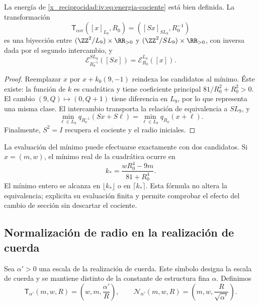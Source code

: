 \begin{theorem}
\label{x_reciprocidad:iv:thm:dualidad-cociente}
La energía de \eqref{x_reciprocidad:iv:eq:energia-cociente} está bien definida.
La transformación
\[
 \mathsf T_{\mathrm{cov}}([x]_{L_9},R_0)
 =([Sx]_{SL_9},R_0^{-1})
\]
es una biyección entre
\((\ZZ^2/L_9)\times\RR_{>0}\) y
\((\ZZ^2/SL_9)\times\RR_{>0}\), con inversa dada por el
segundo intercambio, y
\[
 \mathcal E_{R_0^{-1}}^{SL_9}([Sx])
 =\mathcal E_{R_0}^{L_9}([x]).
\]
\end{theorem}
\begin{proof}
Reemplazar \(x\) por \(x+k_0(9,-1)\) reindexa los candidatos
al mínimo. Éste existe: la función de \(k\) es cuadrática y
tiene coeficiente principal \(81/R_0^2+R_0^2>0\). El cambio
\((9,Q)\mapsto(0,Q+1)\) tiene diferencia en \(L_9\), por
lo que representa una misma clase. El intercambio transporta
la relación de equivalencia a \(SL_9\), y
\[
 \min_{\ell\in L_9}q_{R_0^{-1}}(Sx+S\ell)
 =\min_{\ell\in L_9}q_{R_0}(x+\ell).
\]
Finalmente, \(S^2=I\) recupera el cociente y el radio iniciales.
\end{proof}

La evaluación del mínimo puede efectuarse exactamente con dos
candidatos. Si \(x=(m,w)\), el mínimo real de la cuadrática
ocurre en
\[
 k_* =\frac{wR_0^4-9m}{81+R_0^4}.
\]
El mínimo entero se alcanza en \(\lfloor k_*\rfloor\) o en
\(\lceil k_*\rceil\). Esta fórmula no altera la equivalencia;
explicita su evaluación finita y permite comprobar el efecto
del cambio de sección sin descartar el cociente.

\subsection{Normalización de radio en la realización de cuerda}

Sea \(\alpha'>0\) una escala de la realización de cuerda.
Este símbolo designa la escala de cuerda y se mantiene distinto
de la constante de estructura fina \(\alpha\). Definimos
\begin{equation}
 \mathsf T_{\alpha'}(m,w,R)
 =\left(w,m,\frac{\alpha'}R\right),\qquad
 \mathcal N_{\alpha'}(m,w,R)
 =\left(m,w,\frac R{\sqrt{\alpha'}}\right).
 \label{x_reciprocidad:iv:eq:normalizacion-cuerda}
\end{equation}

